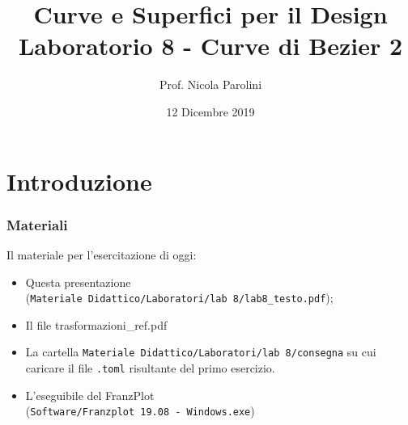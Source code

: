 \documentclass{beamer}
\title[Curve e Sup. - Lab 8]{Curve e Superfici per il Design \\ Laboratorio 8 - Curve di Bezier 2}
\author[Prof. Parolini]{Prof. Nicola Parolini}
\date{12 Dicembre 2019}
\newcommand{\frnzplt}{FranzPlot }
\begin{document}
\begin{frame}
\maketitle
\end{frame}
\section{Introduzione}

\begin{frame}
\frametitle{Materiali}
Il materiale per l'esercitazione di oggi:
\begin{itemize}
\item Questa presentazione \\ (\texttt{Materiale Didattico/Laboratori/lab 8/lab8\_testo.pdf});
\item Il file trasformazioni\_ref.pdf 
\item La cartella \texttt{Materiale Didattico/Laboratori/lab 8/consegna} su cui caricare il file \texttt{.toml} risultante del primo esercizio.
\item L'eseguibile del \frnzplt \\ (\texttt{Software/Franzplot 19.08 - Windows.exe})
\end{itemize}
\end{frame}
\end{document}
